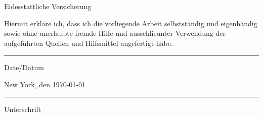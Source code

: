 \begin{titlepage}
\begin{center}{Eidesstattliche Versicherung}
\end{center}
Hiermit erkl\"are ich, dass ich die vorliegende Arbeit selbstst\"andig und
eigenh\"andig sowie ohne unerlaubte fremde Hilfe und ausschlie\sslich unter
Verwendung der aufgef\"uhrten Quellen und Hilfsmittel angefertigt habe. 
\vfill
\begin{center}
\noindent
\begin{minipage}{0.5\textwidth}
\begin{flushleft}
\rule{5cm}{0.4pt}
Date/Datum 
\end{flushleft}
\end{minipage}%
\begin{minipage}{0.5\textwidth}
\begin{flushright} 
New York, den \today \\
\rule{5cm}{0.4pt}
Unterschrift
\end{flushright}
\end{minipage}


\end{center}
\end{titlepage}
